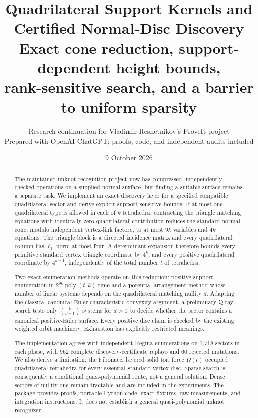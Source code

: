 \documentclass[11pt]{article}
\title{\textcolor{ink}{Quadrilateral Support Kernels and\\
Certified Normal-Disc Discovery}\\[5pt]
\large Exact cone reduction, support-dependent height bounds,\\
rank-sensitive search, and a barrier to uniform sparsity}
\author{Research continuation for Vladimir Reshetnikov's ProveIt project\\
\small Prepared with OpenAI ChatGPT; proofs, code, and independent audits included}
\date{9 October 2026}
\theoremstyle{definition}
\theoremstyle{remark}
\newcommand{\poly}{\operatorname{poly}}
\begin{document}
\maketitle
\begin{abstract}
The maintained unknot-recognition project now has compressed, independently
checked operations on a supplied normal surface, but finding a suitable surface
remains a separate task. We implement an exact discovery layer for a specified
compatible quadrilateral sector and derive explicit support-sensitive bounds.
If at most one quadrilateral type is allowed in each of $k$ tetrahedra, contracting
the triangle matching equations with identically zero quadrilateral contribution
reduces the standard normal cone, modulo independent vertex-link factors, to
at most $9k$ variables and $4k$ equations. The triangle block is a directed
incidence matrix and every quadrilateral column has $\ell_1$ norm at most four.
A determinant expansion therefore bounds every primitive standard vertex
triangle coordinate by $4^k$, and every positive quadrilateral coordinate by
$4^{k-1}$, independently of the total number $t$ of tetrahedra.

Two exact enumeration methods operate on this reduction: positive-support
enumeration in $2^{9k}\poly(t,k)$ time and a potential-arrangement method whose
number of linear systems depends on the quadrilateral matching nullity $d$.
Adapting the classical canonical Euler-characteristic convexity argument, a
preliminary Q-ray search tests only $\binom{k}{d-1}$ systems for $d>0$ to decide whether
the sector contains a canonical positive-Euler surface. Every positive disc
claim is checked by the existing weighted orbit machinery. Exhaustion has
explicitly restricted meanings.

The implementation agrees with independent Regina enumerations on 1,718
sectors in each phase, with 962 complete discovery-certificate replays and
60 rejected mutations. We also derive a limitation: the Fibonacci layered
solid tori force $\Omega(t)$ occupied quadrilateral tetrahedra for every
essential standard vertex disc. Sparse search is consequently a conditional
quasi-polynomial route, not a general solution. Dense sectors of nullity one
remain tractable and are included in the experiments. The package provides
proofs, portable Python code, exact fixtures, raw measurements, and integration
instructions. It does not establish a general quasi-polynomial unknot recognizer.
\end{abstract}

\clearpage
\tableofcontents
\newpage
\end{document}
